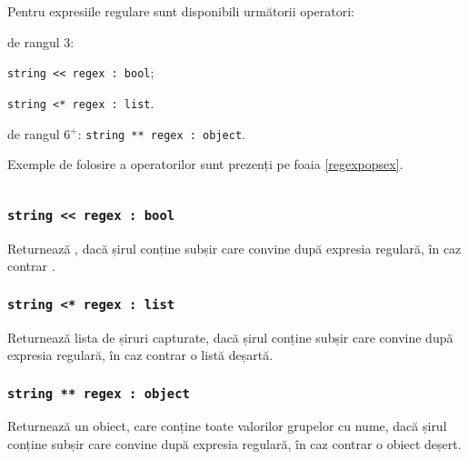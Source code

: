 Pentru expresiile regulare sunt disponibili următorii operatori:
\begin{icItems}
\item
	de rangul 3:
	\begin{icItems}
	\item
		\texttt{string << regex : bool};
	\item
		\texttt{string <* regex : list}.
	\end{icItems}

\item 
	de rangul 6$^+$: \texttt{string ** regex : object}.
\end{icItems}

Exemple de folosire a operatorilor sunt prezenți pe foaia \ref{regexpopsex}.

\begin{sourcecode}
    \label{regexpopsex}
    \inputminted[linenos]{icl}{../sources/regexpopsex.icL}
\end{sourcecode}

\subsubsection{\texttt{string << regex : bool}}

Returnează \true{}, dacă șirul conține subșir care convine după expresia regulară, în caz contrar \false{}.

\subsubsection{\texttt{string <* regex : list}}

Returnează lista de șiruri capturate, dacă șirul conține subșir care convine după expresia regulară, în caz contrar o listă deșartă.

\subsubsection{\texttt{string ** regex : object}}

Returnează un obiect, care conține toate valorilor grupelor cu nume, dacă șirul conține subșir care convine după expresia regulară, în caz contrar o obiect deșert.


